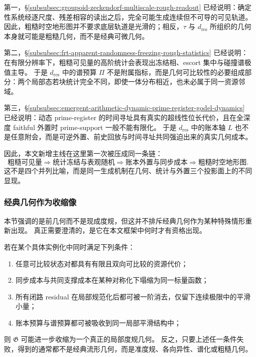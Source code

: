 第一，\S\ref{subsubsec:groupoid-zeckendorf-multiscale-rough-readout} 已经说明：确定性系统经逐尺度、残差相容的读出之后，完全可能生成连续但不可导的可见轨道。
因此，粗糙时空地形图并不要求底层轨道是光滑的；相反，\(\tau\) 与 \(d_{\mathrm{res}}\) 所组织的几何本身就可能是粗糙几何，而不是经典可微几何。

第二，\S\ref{subsubsec:frt-apparent-randomness-freezing-rough-statistics} 已经说明：在有限分辨率下，粗糙可见量的高阶统计会表现出冻结相、escort 集中与碰撞谱极值主导。
于是 \(d_{\mathrm{res}}\) 中的谱预算 \(\Pi\) 不是附属指标，而是几何可比较性的必要组成部分：两个局部态若块统计完全不同，即使一体分布相近，也未必属于同一资源邻域。

第三，\S\ref{subsubsec:emergent-arithmetic-dynamic-prime-register-godel-dynamics} 已经说明：动态 prime-register 的时间寻址具有真实的超线性位长代价，且在全深度 faithful 外置时 prime-support 一般不能有限化。
于是 \(d_{\mathrm{res}}\) 中的账本轴 \(L\) 也不是任意附会，而是可逆外置、前史回放与时间寻址共同强迫出来的真实几何成本。

因此，本文新增主线在这里第一次被压成同一条链：
\[
\text{粗糙可见量}
\Longrightarrow
\text{统计冻结与表观随机}
\Longrightarrow
\text{账本外置与同步成本}
\Longrightarrow
\text{粗糙时空地形图}.
\]
这不是四个并列比喻，而是同一生成机制在几何、统计与外置三个投影面上的不同显现。

\subsubsection{经典几何作为收缩像}\label{subsubsec:typed-address-biaxial-completion-classical-geometry-as-contraction}
本节强调的是前几何而不是现成度规，但这并不排斥经典几何作为某种特殊情形重新出现。
真正需要澄清的，是它在本文框架中何时才有资格出现。

\begin{proposition}[经典几何的收缩条件]\label{prop:typed-address-biaxial-completion-classical-contraction}
若在某个具体实例化中同时满足下列条件：
\begin{enumerate}
  \item 任意可比较状态对都具有有限且双向可比较的资源代价；
  \item 同步成本与共同支撑成本在某种对称化下塌缩为同一标量函数；
  \item 所有闭路 residual 在局部规范化后都可被一阶消去，仅留下连续极限中的平滑小量；
  \item 账本预算与谱预算都可被吸收到同一局部平滑结构中；
\end{enumerate}
则 \(\mathfrak G\) 可能进一步收缩为一个真正的局部度规几何。
反之，只要上述任一条件失败，得到的通常都不是经典流形几何，而是准度规、各向异性、谱化或粗糙几何。
\end{proposition}

